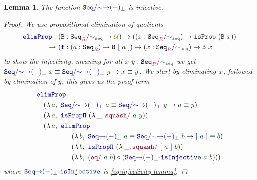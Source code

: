 \documentclass[twoside,11pt,openright]{report}
\theoremstyle{plain} %
\newtheorem{lem}[thm]{Lemma}
\theoremstyle{definition}
\theoremstyle{remark}
\newcommand*{\term}[1]{\textcolor{green!30!black}{#1}} %
\newcommand*{\type}[1]{\textcolor{magenta!90!black}{#1}}
\newcommand*{\universe}[1]{\textcolor{orange!80!black}{#1}}
\newcommand*{\relation}[1]{\textcolor{gray!75!black}{\ensuremath{\mathtt{#1}}}}
\newcommand*{\function}[1]{\textcolor{blue!60!black}{\ensuremath{\mathtt{#1}}}}
\newcommand*{\constructor}[1]{\textcolor{purple!60!black}{\ensuremath{\mathtt{#1}}}}
\newcommand*{\typeformer}[1]{\ensuremath{\mathtt{#1}}}
\begin{document}
\begin{lem}
  The function \(\function{Seq/{\sim}{\rightarrow}(-)_\bot}\) is injective.
  \begin{proof}
    We use propositional elimination of quotients 
    \begin{equation}
      \begin{aligned}
        \function{elimProp} :~& (\typeformer{B} :\typeformer{Seq}_{\type{R}} / \relation{\sim_{seq}} \rightarrow \universe{\mathcal{U}}) \rightarrow ((\term{x} : \typeformer{Seq}_{\type{R}} / \relation{\sim_{seq}}) \rightarrow \typeformer{isProp}~(\typeformer{B}~\term{x})) \\
        \rightarrow~& (\function{f} : (\term{a} : \typeformer{Seq}_{\type{R}}) \rightarrow \typeformer{B}~\function{[}~a~\function{]}) \rightarrow (\term{x} : \typeformer{Seq}_{\type{R}} / \relation{\sim_{seq}}) \rightarrow \typeformer{B}~\term{x}
      \end{aligned}
    \end{equation}
    to show the injectivity, meaning for all \(\term{x}~\term{y} : \typeformer{Seq}_{\type{R}} / \relation{\sim_{seq}}\) we get \(\function{Seq/{\sim}{\rightarrow}(-)_\bot}~\term{x} \equiv \function{Seq/{\sim}{\rightarrow}(-)_\bot}~\term{y} \rightarrow \term{x} \equiv \term{y}\). We start by eliminating \(\term{x}\), followed by elimination of \(y\), this gives us the proof term 
    \begin{equation}
      \begin{aligned}
        &\function{elimProp} \\
        &\quad (\lambda\,\term{a},~\function{Seq/{\sim}{\rightarrow}(-)_\bot}~\term{a} \equiv \function{Seq/{\sim}{\rightarrow}(-)_\bot}~\term{y} \rightarrow \term{a} \equiv \term{y}) \\
        &\quad (\lambda\,\term{a},~\function{isProp\Pi}~(\lambda\,\_, \constructor{squash/}~\term{a}~\term{y})) \\
        &\quad (\lambda\,\term{a},~\function{elimProp} \\
        &\qquad\qquad\quad (\lambda\,\term{b},~\function{Seq{\rightarrow}(-)_\bot}~\term{a} \equiv \function{Seq/{\sim}{\rightarrow}(-)_\bot}~\term{b} \rightarrow \function{[}~\term{a}~\function{]} \equiv \term{b}) \\
        &\qquad\qquad\quad (\lambda\,\term{b},~\function{isProp\Pi}~(\lambda\,\_, \constructor{squash/}~\function{[}~\term{a}~\function{]}~\term{b})) \\
        &\qquad\qquad\quad (\lambda\,\term{b},~(\constructor{eq/}~\term{a}~\term{b}) \circ (\function{Seq{\rightarrow}(-)_\bot\text{-}isInjective}~\term{a}~\term{b})))
      \end{aligned}
    \end{equation}
    where \(\function{Seq{\rightarrow}(-)_\bot\text{-}isInjective}\) is \eqref{eq:injectivity-lemma}, 
  \end{proof}
\end{lem}
\end{document}
